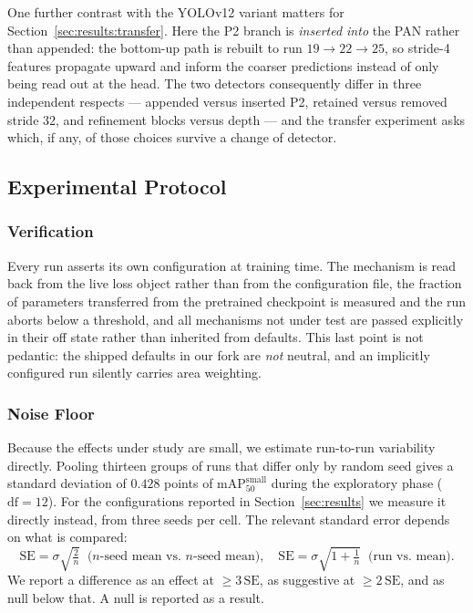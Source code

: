 \documentclass[10pt,twocolumn,a4paper]{article}
\begin{document}
One further contrast with the YOLOv12 variant matters for
Section~\ref{sec:results:transfer}. Here the P2 branch is \emph{inserted into}
the PAN rather than appended: the bottom-up path is rebuilt to run $19
\rightarrow 22 \rightarrow 25$, so stride-4 features propagate upward and inform
the coarser predictions instead of only being read out at the head. The two
detectors consequently differ in three independent respects --- appended versus
inserted P2, retained versus removed stride 32, and refinement blocks versus
depth --- and the transfer experiment asks which, if any, of those choices
survive a change of detector.

\subsection{Experimental Protocol}
\label{sec:method:protocol}

\subsubsection{Verification} Every run asserts its own configuration at
training time. The mechanism is read back from the live loss object rather than
from the configuration file, the fraction of parameters transferred from the
pretrained checkpoint is measured and the run aborts below a threshold, and all
mechanisms not under test are passed explicitly in their off state rather than
inherited from defaults. This last point is not pedantic: the shipped defaults
in our fork are \emph{not} neutral, and an implicitly configured run silently
carries area weighting.

\subsubsection{Noise Floor} Because the effects under study are small, we
estimate run-to-run variability directly. Pooling thirteen groups of runs that
differ only by random seed gives a standard deviation of $0.428$ points of
$\mathrm{mAP}_{50}^{\text{small}}$ during the exploratory phase
($\mathrm{df}=12$). For the configurations reported in
Section~\ref{sec:results} we measure it directly instead, from three seeds per
cell. The relevant standard error depends on what is compared:
\begin{equation}
\mathrm{SE} = \sigma\sqrt{\tfrac2n}\;\;\text{($n$-seed mean vs. $n$-seed mean)},
\quad
\mathrm{SE} = \sigma\sqrt{1 + \tfrac1n}\;\;\text{(run vs. mean)} .
\label{eq:se}
\end{equation}
We report a difference as an effect at $\ge 3\,\mathrm{SE}$, as suggestive at
$\ge 2\,\mathrm{SE}$, and as null below that. A null is reported as a result.
\end{document}

